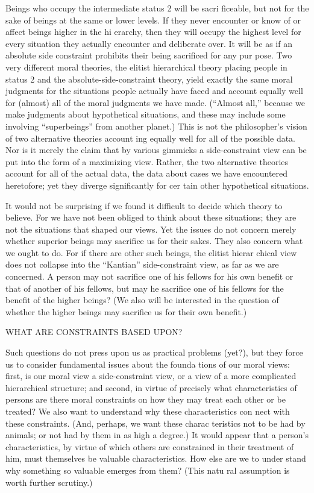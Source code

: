 \documentclass[11pt,openany]{book}
\begin{document}
Beings who occupy the intermediate status 2 will be sacri ficeable, but not for the sake of beings at the same or lower levels. If they never encounter or know of or affect beings higher in the hi erarchy, then they will occupy the highest level for every situation they actually encounter and deliberate over. It will be as if an absolute side constraint prohibits their being sacrificed for any pur pose. Two very different moral theories, the elitist hierarchical theory placing people in status 2 and the absolute-side-constraint theory, yield exactly the same moral judgments for the situations people actually have faced and account equally well for (almost) all of the moral judgments we have made. (``Almost all,'' because we make judgments about hypothetical situations, and these may include some involving ``superbeings'' from another planet.) This is not the philosopher's vision of two alternative theories account ing equally well for all of the possible data. Nor is it merely the claim that by various gimmicks a side-constraint view can be put into the form of a maximizing view. Rather, the two alternative theories account for all of the actual data, the data about cases we have encountered heretofore; yet they diverge significantly for cer tain other hypothetical situations. 

It would not be surprising if we found it difficult to decide which theory to believe. For we have not been obliged to think about these situations; they are not the situations that shaped our views. Yet the issues do not concern merely whether superior beings may sacrifice us for their sakes. They also concern what we ought to do. For if there are other such beings, the elitist hierar chical view does not collapse into the ``Kantian'' side-constraint view, as far as we are concerned. A person may not sacrifice one of his fellows for his own benefit or that of another of his fellows, but may he sacrifice one of his fellows for the benefit of the higher beings? (We also will be interested in the question of whether the higher beings may sacrifice us for their own benefit.) 

WHAT ARE CONSTRAINTS BASED UPON? 

Such questions do not press upon us as practical problems (yet?), but they force us to consider fundamental issues about the founda tions of our moral views: first, is our moral view a side-constraint view, or a view of a more complicated hierarchical structure; and second, in virtue of precisely what characteristics of persons are there moral constraints on how they may treat each other or be treated? We also want to understand why these characteristics con nect with these constraints. (And, perhaps, we want these charac teristics not to be had by animals; or not had by them in as high a degree.) It would appear that a person's characteristics, by virtue of which others are constrained in their treatment of him, must themselves be valuable characteristics. How else are we to under stand why something so valuable emerges from them? (This natu ral assumption is worth further scrutiny.) 
\end{document}
